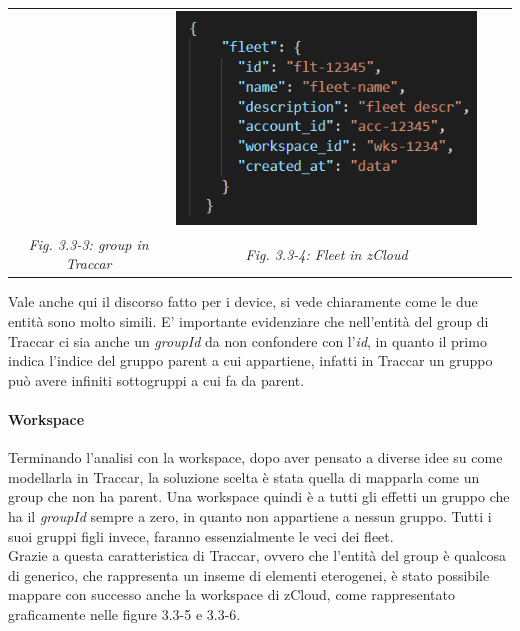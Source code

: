 \documentclass[a4paper,titlepage,12pt]{report}
\begin{document}
{\begin{center}
\begin{tabular}{c c c c}
 &  
\includegraphics[scale=0.7]{images/zClGr.png} \\
\textit{Fig. 3.3-3: group in Traccar} &  \textit{Fig. 3.3-4: Fleet in zCloud}
\end{tabular}
\end{center}\par\medskip


Vale anche qui il discorso fatto per i device, si vede chiaramente come le due entità sono molto simili. E' importante evidenziare che nell'entità del group di Traccar ci sia anche un \textit{groupId} da non confondere con l'\textit{id}, in quanto il primo indica l'indice del gruppo parent a cui appartiene, infatti in Traccar un gruppo può avere infiniti sottogruppi a cui fa da parent. 

\paragraph{
Workspace}
Terminando l'analisi con la workspace, dopo aver pensato a diverse idee su come modellarla in Traccar, la soluzione scelta è stata quella di mapparla come un group che non ha parent. Una workspace quindi è a tutti gli effetti un gruppo che ha il \textit{groupId} sempre a zero, in quanto non appartiene a nessun gruppo. Tutti i suoi gruppi figli invece, faranno essenzialmente le veci dei fleet.\\
Grazie a questa caratteristica di Traccar, ovvero che l'entità del group è qualcosa di generico, che rappresenta un inseme di elementi eterogenei, è stato possibile mappare con successo anche la workspace di zCloud, come rappresentato graficamente nelle figure 3.3-5 e 3.3-6.


\begin{center}
\begin{tabular}{c c c cc c c}



\end{tabular}
\end{center}}
\end{document}
